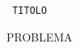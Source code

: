 \documentclass[legalpaper]{article}
\begin{document}
\pagestyle{empty}
\Huge

\begin{center}       %
	{  \fontsize{35pt}{20}\selectfont \texttt{
		{{TITOLO}}	 }}
\end{center}
\bigskip\bigskip	 %

{{PROBLEMA}}
\end{document}
